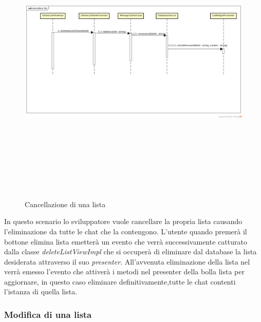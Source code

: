 \label{Cancellazione di una lista}
\begin{figure}[H]
	\centering
	\includegraphics[width=16cm, height=14cm, angle=90]{Sezioni/Diagrammi/img_app/cancellare_lista.jpg}
	\caption{Cancellazione di una lista}
\end{figure}

In questo scenario lo sviluppatore vuole cancellare la propria lista causando l'eliminazione da tutte le chat che la contengono. L'utente quando premerà il bottone elimina lista emetterà un evento che verrà successivamente catturato dalla classe \textit{deleteListViewImpl} che si occuperà di eliminare dal database la lista desiderata attraverso il suo \textit{presenter}. All'avvenuta eliminazione della lista nel  verrà emesso l'evento che attiverà i metodi nel presenter della bolla lista per aggiornare, in questo caso eliminare definitivamente,tutte le chat contenti l'istanza di quella lista. 

\subsubsection{Modifica di una lista}

